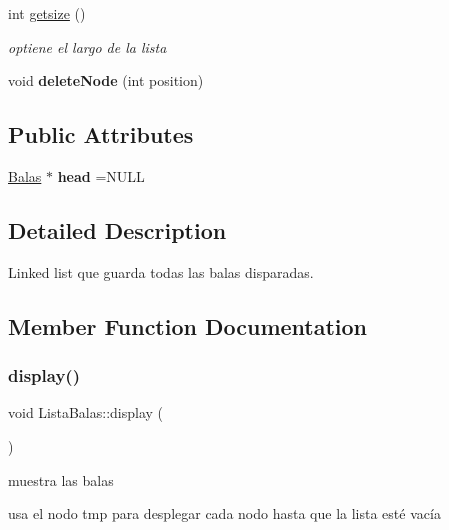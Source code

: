 \begin{DoxyCompactItemize}
int \hyperlink{classListaBalas_acd8346cc5d06186c486c28743a4e9ccb}{getsize} ()
\begin{DoxyCompactList}\small\item\em optiene el largo de la lista \end{DoxyCompactList}\item 
\mbox{\label{classListaBalas_a19dd6cf913126b5a4dc8ea4851322b18}} 
void {\bfseries delete\+Node} (int position)
\end{DoxyCompactItemize}
\subsection*{Public Attributes}
\begin{DoxyCompactItemize}
\item 
\mbox{\label{classListaBalas_ae1ce1d2fb377e8be991a975c2783ceb8}} 
\hyperlink{classBalas}{Balas} $\ast$ {\bfseries head} =N\+U\+LL
\end{DoxyCompactItemize}


\subsection{Detailed Description}
Linked list que guarda todas las balas disparadas. 

\subsection{Member Function Documentation}
\mbox{\label{classListaBalas_a5ce452a7adfbe4e734239579e30a50e2}} 
\subsubsection{\texorpdfstring{display()}{display()}}
{\footnotesize\ttfamily void Lista\+Balas\+::display (\begin{DoxyParamCaption}{ }\end{DoxyParamCaption})\hspace{0.3cm}{\ttfamily [inline]}}



muestra las balas 

usa el nodo tmp para desplegar cada nodo hasta que la lista esté vacía \mbox{\label{classListaBalas_ad04cd8b77e658ad2d4cfd8bcccd45411}} 
